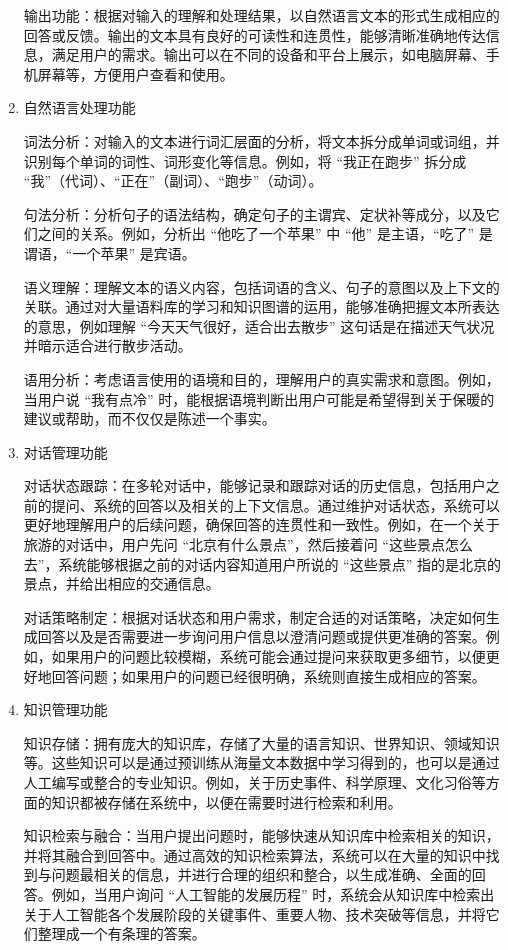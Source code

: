 \documentclass[
    report,     %
    oneside,    %
    UTF8,       %
    zihao=-4    %
]{config} %
\begin{document}
\begin{enumerate}[label=(\arabic*)]
输出功能：根据对输入的理解和处理结果，以自然语言文本的形式生成相应的回答或反馈。输出的文本具有良好的可读性和连贯性，能够清晰准确地传达信息，满足用户的需求。输出可以在不同的设备和平台上展示，如电脑屏幕、手机屏幕等，方便用户查看和使用。

\item 自然语言处理功能

词法分析：对输入的文本进行词汇层面的分析，将文本拆分成单词或词组，并识别每个单词的词性、词形变化等信息。例如，将 “我正在跑步” 拆分成 “我”（代词）、“正在”（副词）、“跑步”（动词）。

句法分析：分析句子的语法结构，确定句子的主谓宾、定状补等成分，以及它们之间的关系。例如，分析出 “他吃了一个苹果” 中 “他” 是主语，“吃了” 是谓语，“一个苹果” 是宾语。

语义理解：理解文本的语义内容，包括词语的含义、句子的意图以及上下文的关联。通过对大量语料库的学习和知识图谱的运用，能够准确把握文本所表达的意思，例如理解 “今天天气很好，适合出去散步” 这句话是在描述天气状况并暗示适合进行散步活动。

语用分析：考虑语言使用的语境和目的，理解用户的真实需求和意图。例如，当用户说 “我有点冷” 时，能根据语境判断出用户可能是希望得到关于保暖的建议或帮助，而不仅仅是陈述一个事实。

\item 对话管理功能

对话状态跟踪：在多轮对话中，能够记录和跟踪对话的历史信息，包括用户之前的提问、系统的回答以及相关的上下文信息。通过维护对话状态，系统可以更好地理解用户的后续问题，确保回答的连贯性和一致性。例如，在一个关于旅游的对话中，用户先问 “北京有什么景点”，然后接着问 “这些景点怎么去”，系统能够根据之前的对话内容知道用户所说的 “这些景点” 指的是北京的景点，并给出相应的交通信息。

对话策略制定：根据对话状态和用户需求，制定合适的对话策略，决定如何生成回答以及是否需要进一步询问用户信息以澄清问题或提供更准确的答案。例如，如果用户的问题比较模糊，系统可能会通过提问来获取更多细节，以便更好地回答问题；如果用户的问题已经很明确，系统则直接生成相应的答案。

\item 知识管理功能

知识存储：拥有庞大的知识库，存储了大量的语言知识、世界知识、领域知识等。这些知识可以是通过预训练从海量文本数据中学习得到的，也可以是通过人工编写或整合的专业知识。例如，关于历史事件、科学原理、文化习俗等方面的知识都被存储在系统中，以便在需要时进行检索和利用。

知识检索与融合：当用户提出问题时，能够快速从知识库中检索相关的知识，并将其融合到回答中。通过高效的知识检索算法，系统可以在大量的知识中找到与问题最相关的信息，并进行合理的组织和整合，以生成准确、全面的回答。例如，当用户询问 “人工智能的发展历程” 时，系统会从知识库中检索出关于人工智能各个发展阶段的关键事件、重要人物、技术突破等信息，并将它们整理成一个有条理的答案。


\end{enumerate}
\end{document}
